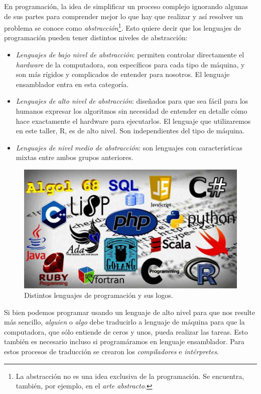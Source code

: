 \documentclass[
]{book}
\providecommand{\tightlist}{%
  \setlength{\itemsep}{0pt}\setlength{\parskip}{0pt}}
\begin{document}
En programación, la idea de simplificar un proceso complejo ignorando algunas de sus partes para comprender mejor lo que hay que realizar y así resolver un problema se conoce como \emph{abstracción}\footnote{La abstracción no es una idea exclusiva de la programación. Se encuentra, también, por ejemplo, en el \emph{arte abstracto}.}. Esto quiere decir que los lenguajes de programación pueden tener distintos niveles de abstracción:

\begin{itemize}
\tightlist
\item
  \emph{Lenguajes de bajo nivel de abstracción}: permiten controlar directamente el \emph{hardware} de la computadora, son específicos para cada tipo de máquina, y son más rígidos y complicados de entender para nosotros. El lenguaje ensamblador entra en esta categoría.
\item
  \emph{Lenguajes de alto nivel de abstracción}: diseñados para que sea fácil para los humanos expresar los algoritmos sin necesidad de entender en detalle cómo hace exactamente el hardware para ejecutarlos. El lenguaje que utilizaremos en este taller, R, es de alto nivel. Son independientes del tipo de máquina.
\item
  \emph{Lenguajes de nivel medio de abstracción}: son lenguajes con características mixtas entre ambos grupos anteriores.
\end{itemize}

\begin{figure}

{\centering \includegraphics[width=0.7\linewidth]{images/intro/07_lenguajes} 

}

\caption{Distintos lenguajes de programación y sus logos.}\label{fig:lenguajes}
\end{figure}

Si bien podemos programar usando un lenguaje de alto nivel para que nos resulte más sencillo, \emph{alguien} o \emph{algo} debe traducirlo a lenguaje de máquina para que la computadora, que sólo entiende de ceros y unos, pueda realizar las tareas. Esto también es necesario incluso si programáramos en lenguaje ensamblador. Para estos procesos de traducción se crearon los \emph{compiladores} e \emph{intérpretes}.
\end{document}
